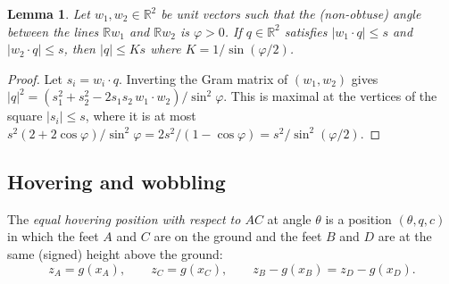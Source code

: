 \documentclass[a4paper,11pt,twoside,leqno]{article}
\newtheorem{lem}[teo]{Lemma}
\newcommand{\rr}[0]{\ensuremath{\mathbb{R}}}
\numberwithin{equation}{section}
\begin{document}
\begin{lem}\label{lem-diag}
Let $w_1,w_2 \in \rr^2$ be unit vectors such that the (non-obtuse) angle between the lines $\rr w_1$ and $\rr w_2$ is $\varphi > 0$. If $q \in \rr^2$ satisfies $|w_1 \cdot q| \leq s$ and $|w_2 \cdot q| \leq s$, then $|q| \leq K s$ where $K = 1/\sin(\varphi/2)$.
\end{lem}
\begin{proof}
Let $s_i = w_i \cdot q$. Inverting the Gram matrix of $(w_1,w_2)$ gives $|q|^2 = (s_1^2 + s_2^2 - 2 s_1 s_2 \,w_1 \cdot w_2)/\sin^2 \varphi$. This is maximal at the vertices of the square $|s_i| \leq s$, where it is at most $s^2(2+2\cos\varphi)/\sin^2\varphi = 2s^2/(1-\cos\varphi) = s^2/\sin^2(\varphi/2)$.
\end{proof}

\subsection{Hovering and wobbling}

The \emph{equal hovering position with respect to $AC$} at angle $\theta$ is a position $(\theta,q,c)$ in which the feet $A$ and $C$ are on the ground and the feet $B$ and $D$ are at the same (signed) height above the ground:
\begin{equation}\label{eq-hover}
z_A = g(x_A), \qquad z_C = g(x_C), \qquad z_B - g(x_B) = z_D - g(x_D).
\end{equation}
\end{document}
